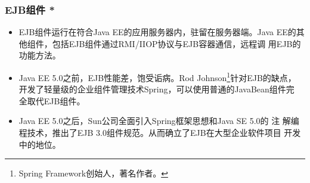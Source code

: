 \begin{frame}
  \frametitle{EJB组件 *} 

  \begin{itemize}
  \item EJB组件运行在符合Java EE的应用服务器内，驻留在服务器端。Java
    EE的其他组件，包括EJB组件通过RMI/IIOP协议与EJB容器通信，远程调
    用EJB的功能方法。
  \item Java EE 5.0之前，EJB性能差，饱受诟病。Rod
    Johnson\footnote{Spring Framework创始人，著名作者。}针对EJB的缺点，
    开发了轻量级的企业组件管理技术Spring，{\kai\Red 可以使用普通的JavaBean组件完
    全取代EJB组件}。
  \item Java EE 5.0之后，Sun公司全面引入Spring框架思想和Java SE 5.0的 {\kai\Red 注
    解编程技术}，推出了EJB 3.0组件规范。从而确立了EJB在大型企业软件项目
    开发中的地位。
  \end{itemize}
  
\end{frame}


